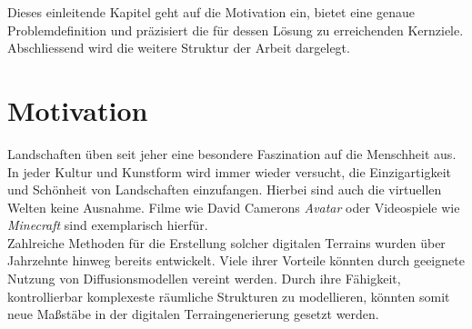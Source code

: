 Dieses einleitende Kapitel geht auf die Motivation ein, bietet eine genaue Problemdefinition und präzisiert die für dessen Lösung zu erreichenden Kernziele. Abschliessend wird die weitere Struktur der Arbeit dargelegt. 


\section{Motivation}

Landschaften üben seit jeher eine besondere Faszination auf die Menschheit aus. In jeder Kultur und Kunstform wird immer wieder versucht, die Einzigartigkeit und Schönheit von Landschaften einzufangen. Hierbei sind auch die virtuellen Welten keine Ausnahme. Filme wie David Camerons \textit{Avatar} oder Videospiele wie \textit{Minecraft} sind exemplarisch hierfür. \\
Zahlreiche Methoden für die Erstellung solcher digitalen Terrains wurden über Jahrzehnte hinweg bereits entwickelt. Viele ihrer Vorteile könnten durch geeignete Nutzung von Diffusionsmodellen vereint werden. Durch ihre Fähigkeit, kontrollierbar komplexeste räumliche Strukturen zu modellieren, könnten somit neue Maßstäbe in der digitalen Terraingenerierung gesetzt werden.\\
